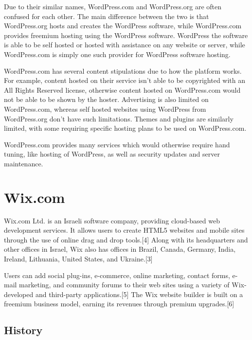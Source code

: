 \documentclass[12pt]{article}
\begin{document}
Due to their similar names, WordPress.com and WordPress.org are often confused for each other. The main difference between the two is that WordPress.org hosts and creates the WordPress software, while WordPress.com provides freemium hosting using the WordPress software. WordPress the software is able to be self hosted or hosted with assistance on any website or server, while WordPress.com is simply one such provider for WordPress software hosting.

WordPress.com has several content stipulations due to how the platform works. For example, content hosted on their service isn't able to be copyrighted with an All Rights Reserved license, otherwise content hosted on WordPress.com would not be able to be shown by the hoster. Advertising is also limited on WordPress.com, whereas self hosted websites using WordPress from WordPress.org don't have such limitations. Themes and plugins are similarly limited, with some requiring specific hosting plans to be used on WordPress.com.

WordPress.com provides many services which would otherwise require hand tuning, like hosting of WordPress, as well as security updates and server maintenance. 



\newpage

\section{Wix.com}

Wix.com Ltd. is an Israeli software company, providing cloud-based web development services. It allows users to create HTML5 websites and mobile sites through the use of online drag and drop tools.[4] Along with its headquarters and other offices in Israel, Wix also has offices in Brazil, Canada, Germany, India, Ireland, Lithuania, United States, and Ukraine.[3]

Users can add social plug-ins, e-commerce, online marketing, contact forms, e-mail marketing, and community forums to their web sites using a variety of Wix-developed and third-party applications.[5] The Wix website builder is built on a freemium business model, earning its revenues through premium upgrades.[6] 



\subsection{History}
\end{document}
